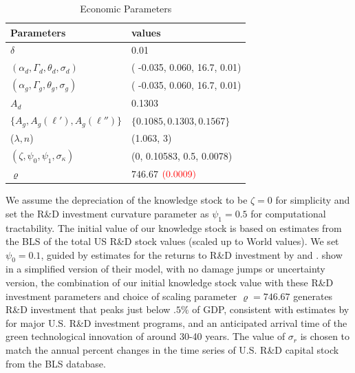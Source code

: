\documentclass[12pt]{article}
\begin{document}
\begin{appendices}
\begin{table}[H]
\caption{Economic Parameters}\label{table:econ_parameters}
	\centering
	\begin{tabular}{ll}
   \hline
		Parameters & values\\
		\toprule
		$\delta$ & 0.01\\
		$(\alpha_d, \Gamma_d, \theta_d, \sigma_d)$ & ( -0.035, 0.060, 16.7, 0.01)\\
		$(\alpha_g, \Gamma_g, \theta_g, \sigma_g)$ & ( -0.035, 0.060, 16.7, 0.01) \\
		$A_d$ & 0.1303 \\
		$\{A_g, A_g(\ell'), A_g(\ell'')\}$ & $\{0.1085, 0.1303, 0.1567 \}$ \\
        ($\lambda, n$) & (1.063, 3) \\
		$(\zeta, \psi_0, \psi_1, \sigma_{\kappa})$ & (0, 0.10583, 0.5, 0.0078)\\
        $\varrho$ & $746.67$ ${\color{red}(0.0009)}$ \\ %
		\bottomrule
	\end{tabular}


\end{table}

We assume the depreciation of the knowledge stock to be $\zeta = 0$ for simplicity and set the R\&D investment curvature parameter as $\psi_1=0.5$ for computational tractability. The initial value of our knowledge stock is based on estimates from the BLS of the total US R\&D stock values (scaled up to World values). We set $\psi_0 = 0.1$, guided by estimates for the returns to R\&D investment by \cite{lucking2019have} and \cite{bloom2019toolkit}. \cite{BarnettBrockHansenZhang:2023} show in a simplified version of their model, with no damage jumps or uncertainty version, the combination of our initial knowledge stock value with these R\&D investment parameters and choice of scaling parameter $\varrho = 746.67$ generates R\&D investment that peaks just below $.5\%$ of GDP, consistent with estimates by \cite{stine2008manhattan} for major U.S. R\&D investment programs, and an anticipated arrival time of the green technological innovation of around 30-40 years. The value of $\sigma_{r}$ is chosen to match the annual percent changes in the time series of U.S. R\&D capital stock from the BLS database. 


\end{appendices}
\end{document}
